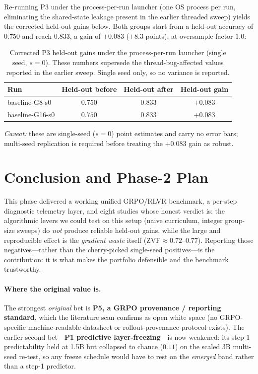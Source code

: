\documentclass[12pt,a4paper]{report}
\newcommand{\zvf}{\mathrm{ZVF}}
\begin{document}
Re-running P3 under the process-per-run launcher (one OS process per run, eliminating
the shared-state leakage present in the earlier threaded sweep) yields the corrected
held-out gains below. Both groups start from a held-out accuracy of $0.750$ and reach
$0.833$, a gain of $+0.083$ ($+8.3$ points), at oversample factor $1.0$:

\begin{table}[h]
\centering
\begin{tabular}{lccc}
\toprule
Run & Held-out before & Held-out after & Held-out gain \\
\midrule
baseline-G8-s0  & $0.750$ & $0.833$ & $+0.083$ \\
baseline-G16-s0 & $0.750$ & $0.833$ & $+0.083$ \\
\bottomrule
\end{tabular}
\caption{Corrected P3 held-out gains under the process-per-run launcher (single seed, $s{=}0$).
These numbers supersede the thread-bug-affected values reported in the earlier sweep.
Single seed only, so no variance is reported.}
\label{tab:p3-process-isolated}
\end{table}

\noindent\emph{Caveat:} these are single-seed ($s{=}0$) point estimates and carry no error
bars; multi-seed replication is required before treating the $+0.083$ gain as robust.

\section{Conclusion and Phase-2 Plan}
\label{sec:conclusion}

This phase delivered a working unified GRPO/RLVR benchmark, a per-step diagnostic
telemetry layer, and eight studies whose honest verdict is: the algorithmic
levers we could test on this setup (naive curriculum, integer group-size sweeps)
do \emph{not} produce reliable held-out gains, while the large and reproducible
effect is the \emph{gradient waste} itself ($\zvf \approx 0.72$--$0.77$). Reporting
those negatives---rather than the cherry-picked single-seed positives---is the
contribution: it is what makes the portfolio defensible and the benchmark
trustworthy.

\paragraph{Where the original value is.} The strongest \emph{original} bet is
\textbf{P5, a GRPO provenance / reporting standard}, which the literature scan
confirms as open white space (no GRPO-specific machine-readable datasheet or
rollout-provenance protocol exists). The earlier second bet---\textbf{P1 predictive
layer-freezing}---is now weakened: its step-1 predictability held at 1.5B but collapsed
to chance ($0.11$) on the scaled 3B multi-seed re-test, so any freeze schedule would
have to rest on the \emph{emerged} band rather than a step-1 predictor.
\end{document}
